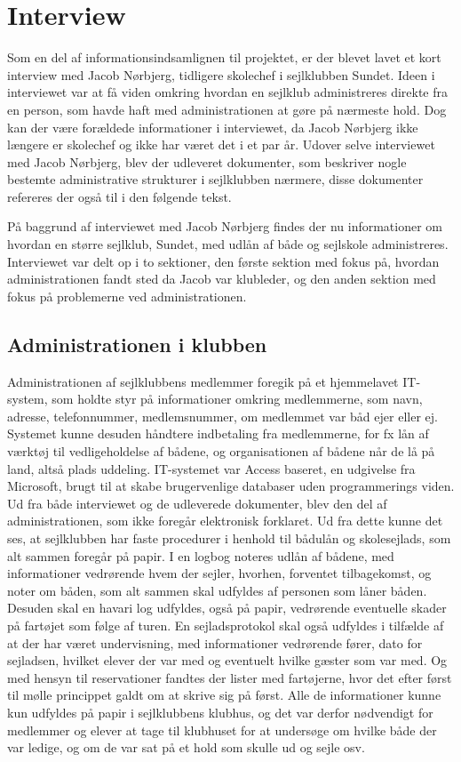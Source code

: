 \chapter{Interview}\label{bilag:interview}
Som en del af informationsindsamlignen til projektet, er der blevet lavet et kort interview med Jacob Nørbjerg, tidligere skolechef i sejlklubben Sundet. Ideen i interviewet var at få viden omkring hvordan en sejlklub administreres direkte fra en person, som havde haft med administrationen at gøre på nærmeste hold. Dog kan der være forældede informationer i interviewet, da Jacob Nørbjerg ikke længere er skolechef og ikke har været det i et par år. Udover selve interviewet med Jacob Nørbjerg, blev der udleveret dokumenter, som beskriver nogle bestemte administrative strukturer i sejlklubben nærmere, disse dokumenter refereres der også til i den følgende tekst.

På baggrund af interviewet med Jacob Nørbjerg findes der nu informationer om hvordan en større sejlklub, Sundet, med udlån af både og sejlskole administreres. Interviewet var delt op i to sektioner, den første sektion med fokus på, hvordan administrationen fandt sted da Jacob var klubleder, og den anden sektion med fokus på problemerne ved administrationen.
\section*{Administrationen i klubben}
Administrationen af sejlklubbens medlemmer foregik på et hjemmelavet IT-system, som holdte styr på informationer omkring medlemmerne, som navn, adresse, telefonnummer, medlemsnummer, om medlemmet var båd ejer eller ej. Systemet kunne desuden håndtere indbetaling fra medlemmerne, for fx lån af værktøj til vedligeholdelse af bådene, og organisationen af bådene når de lå på land, altså plads uddeling. IT-systemet var Access baseret, en udgivelse fra Microsoft, brugt til at skabe brugervenlige databaser uden programmerings viden.
Ud fra både interviewet og de udleverede dokumenter, blev den del af administrationen, som ikke foregår elektronisk forklaret. Ud fra dette kunne det ses, at sejlklubben har faste procedurer i henhold til bådulån og skolesejlads, som alt sammen foregår på papir. I en logbog noteres udlån af bådene, med informationer vedrørende hvem der sejler, hvorhen, forventet tilbagekomst, og noter om båden, som alt sammen skal udfyldes af personen som låner båden. Desuden skal en havari log udfyldes, også på papir, vedrørende eventuelle skader på fartøjet som følge af turen. En sejladsprotokol skal også udfyldes i tilfælde af at der har været undervisning, med informationer vedrørende fører, dato for sejladsen, hvilket elever der var med og eventuelt hvilke gæster som var med. Og med hensyn til reservationer fandtes der lister med fartøjerne, hvor det efter først til mølle princippet galdt om at skrive sig på først. Alle de informationer kunne kun udfyldes på papir i sejlklubbens klubhus, og det var derfor nødvendigt for medlemmer og elever at tage til klubhuset for at undersøge om hvilke både der var ledige, og om de var sat på et hold som skulle ud og sejle osv. 
